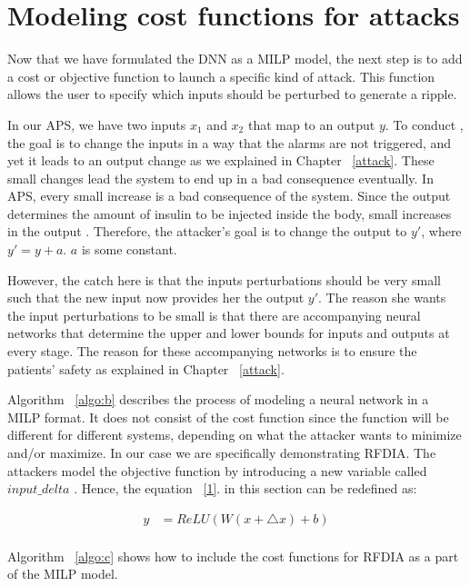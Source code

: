 \section{Modeling cost functions for attacks}
\label{section:costfunction}
Now that we have formulated the DNN as a MILP model, the next step is to add a cost or objective function to launch a specific kind of attack. 
This function allows the user to specify which inputs should be perturbed to generate a ripple.

In our \ac{APS}, we have two inputs $x_1$ and $x_2$ that map to an output $y$. 
To conduct \attack, the goal is to change the inputs in a way that the alarms are not triggered, and yet it leads to an output change as we explained in Chapter ~\ref{attack}. 
These small changes lead the system to end up in a bad consequence eventually. 
In \ac{APS}, every small increase is a bad consequence of the system. 
Since the output determines the amount of insulin to be injected inside the body, small increases in the output .
Therefore, the attacker's goal is to change the output to $y'$, where $y' = y + a$. $a$ is some constant. 

However, the catch here is that the inputs perturbations should be very small such that the new input now provides her the output $y'$.  
The reason she wants the input perturbations to be small is that there are accompanying neural networks that determine the upper and lower bounds for inputs and outputs at every stage. 
The reason for these accompanying networks is to ensure the patients' safety as explained in Chapter ~\ref{attack}.

Algorithm ~\ref{algo:b} describes the process of modeling a neural network in a MILP format.
It does not consist of the cost function since the function will be different for different systems, depending on what the attacker wants to minimize and/or maximize.
In our case we are specifically demonstrating \ac{RFDIA}. 
The attackers model the objective function by introducing a new variable called $input\_delta$ . Hence, the equation ~\ref{1}.
in this section can be redefined as:

\begin{align}
\label{11}
y &=  ReLU(W(x + \bigtriangleup  x ) + b)\\
\end{align}

Algorithm ~\ref{algo:c} shows how to include the cost functions for \ac{RFDIA} as a part of the MILP model. 
 
